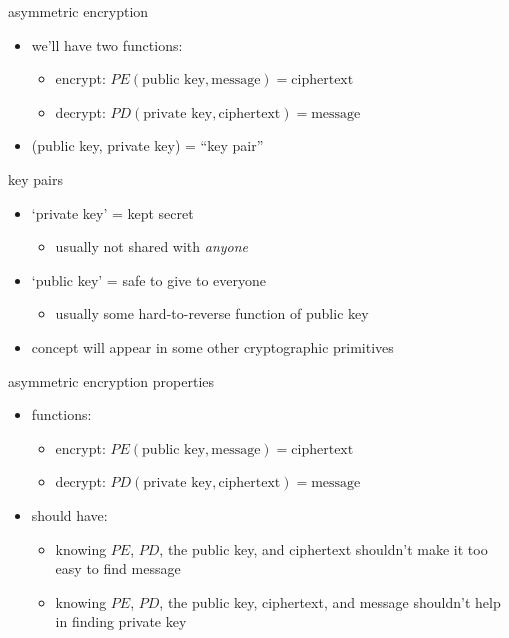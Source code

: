 \begin{frame}{asymmetric encryption}
\begin{itemize}
\item we'll have two functions:
    \begin{itemize}
    \item encrypt: $PE(\text{public key}, \text{message}) = \text{ciphertext}$
    \item decrypt: $PD(\text{private key}, \text{ciphertext}) = \text{message}$
    \end{itemize}
\item (public key, private key) = ``key pair''
\end{itemize}
\end{frame}

\begin{frame}{key pairs}
    \begin{itemize}
    \item `private key' = kept secret
        \begin{itemize}
        \item usually not shared with \textit{anyone}
        \end{itemize}
    \item `public key' = safe to give to everyone
        \begin{itemize}
        \item usually some hard-to-reverse function of public key
        \end{itemize}
    \vspace{.5cm}
    \item concept will appear in some other cryptographic primitives
    \end{itemize}
\end{frame}

\begin{frame}{asymmetric encryption properties}
\begin{itemize}
\item functions:
    \begin{itemize}
    \item encrypt: $PE(\text{public key}, \text{message}) = \text{ciphertext}$
    \item decrypt: $PD(\text{private key}, \text{ciphertext}) = \text{message}$
    \end{itemize}
\item should have:
    \begin{itemize}
    \item knowing $PE$, $PD$, the public key, and ciphertext shouldn't make it too easy to find message
    \item knowing $PE$, $PD$, the public key, ciphertext, and message shouldn't help in finding private key
    \end{itemize}
\end{itemize}
\end{frame}

